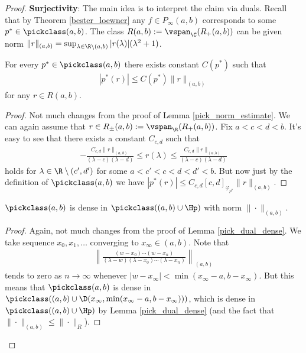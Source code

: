 \begin{proof}
	\textbf{Surjectivity}: The main idea is to interpret the claim via duals. Recall that by Theorem \ref{bester_loewner} any $f \in P_{\infty}(a, b)$ corresponds to some $p^{*} \in \pickclass(a, b)$. The class $R(a, b) := \vspan_{\C}(R_{+}(a, b))$ can be given norm $\|r\|_{(a, b)} = \sup_{\lambda \in \R \setminus (a, b)} |r(\lambda)| (\lambda^{2} + 1)$.
	\begin{lem}\label{pick_norm_estimate_2}
		For every $p^{*} \in \pickclass(a, b)$ there exists constant $C(p^{*})$ such that
		\begin{align*}
			\left|p^{*} (r)\right| \leq C(p^{*}) \|r\|_{(a, b)}
		\end{align*}
		for any $r \in R(a, b)$.
	\end{lem}
	\begin{proof}
		Not much changes from the proof of Lemma \ref{pick_norm_estimate}. We can again assume that $r \in R_{\pm}(a, b) := \vspan_{\R}(R_{+}(a, b))$. Fix $a < c < d < b$. It's easy to see that there exists a constant $C_{c, d}$ such that
		\begin{align*}
			-\frac{C_{c, d}\|r\|_{(a, b)}}{(\lambda - c) (\lambda - d)} \leq r(\lambda) \leq \frac{C_{c, d}\|r\|_{(a, b)}}{(\lambda - c) (\lambda - d)}
		\end{align*}
		holds for $\lambda \in \R \setminus (c', d')$ for some $a < c' < c < d < d' < b$. But now just by the definition of $\pickclass(a, b)$ we have $|p^{*}(r)| \leq C_{c, d} [c, d]_{\varphi_{p^{*}}} \|r\|_{(a, b)}$.
	\end{proof}
	\begin{lem}\label{pick_dual_dense_2}
		$\pickclass(a, b)$ is dense in $\pickclass((a, b) \cup \Hp)$ with norm $\|\cdot\|_{(a, b)}$.
	\end{lem}
	\begin{proof}
		Again, not much changes from the proof of Lemma \ref{pick_dual_dense}. We take sequence $x_{0}, x_{1}, \ldots $ converging to $x_{\infty} \in (a, b)$. Note that
		\begin{align*}
			\left\|\frac{(w - x_{0}) \cdots (w - x_{n})}{(\lambda - w)(\lambda - x_{0}) \cdots (\lambda - x_{n})}\right\|_{(a, b)}
		\end{align*}
		tends to zero as $n \to \infty$ whenever $|w - x_{\infty}| < \min(x_{\infty} - a, b - x_{\infty})$. But this means that $\pickclass(a, b)$ is dense in $\pickclass((a, b) \cup \D(x_{\infty}, \min(x_{\infty} - a, b - x_{\infty})))$, which is dense in $\pickclass((a, b) \cup \Hp)$ by Lemma \ref{pick_dual_dense} (and the fact that $\|\cdot\|_{(a, b)} \leq \|\cdot\|_{R}$).

\end{proof}
\end{proof}
